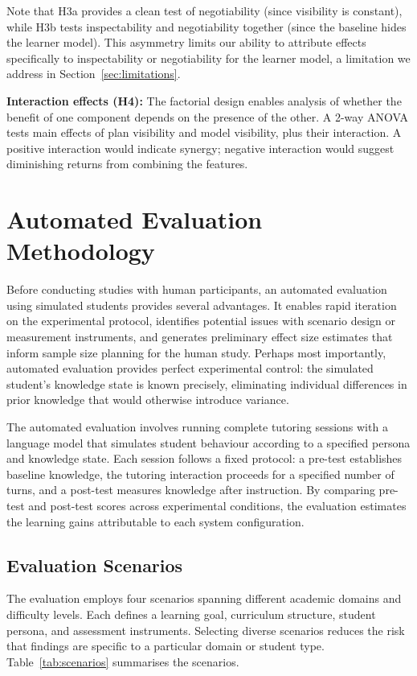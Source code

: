 \documentclass[logo,bsc,singlespacing,parskip,online]{infthesis}
\begin{document}
Note that H3a provides a clean test of negotiability (since visibility is constant), while H3b tests inspectability and negotiability together (since the baseline hides the learner model). This asymmetry limits our ability to attribute effects specifically to inspectability or negotiability for the learner model, a limitation we address in Section~\ref{sec:limitations}.

\textbf{Interaction effects (H4):} The factorial design enables analysis of whether the benefit of one component depends on the presence of the other. A 2-way ANOVA tests main effects of plan visibility and model visibility, plus their interaction. A positive interaction would indicate synergy; negative interaction would suggest diminishing returns from combining the features.

\section{Automated Evaluation Methodology}

Before conducting studies with human participants, an automated evaluation using simulated students provides several advantages. It enables rapid iteration on the experimental protocol, identifies potential issues with scenario design or measurement instruments, and generates preliminary effect size estimates that inform sample size planning for the human study. Perhaps most importantly, automated evaluation provides perfect experimental control: the simulated student's knowledge state is known precisely, eliminating individual differences in prior knowledge that would otherwise introduce variance.

The automated evaluation involves running complete tutoring sessions with a language model that simulates student behaviour according to a specified persona and knowledge state. Each session follows a fixed protocol: a pre-test establishes baseline knowledge, the tutoring interaction proceeds for a specified number of turns, and a post-test measures knowledge after instruction. By comparing pre-test and post-test scores across experimental conditions, the evaluation estimates the learning gains attributable to each system configuration.

\subsection{Evaluation Scenarios}

The evaluation employs four scenarios spanning different academic domains and difficulty levels. Each defines a learning goal, curriculum structure, student persona, and assessment instruments. Selecting diverse scenarios reduces the risk that findings are specific to a particular domain or student type. Table~\ref{tab:scenarios} summarises the scenarios.
\end{document}
